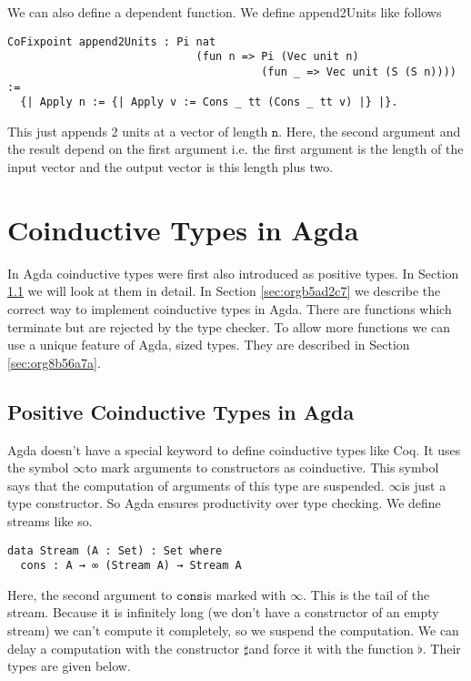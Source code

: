 \documentclass[a4paper,cleardoubleempty,BCOR1cm]{scrbook}
\begin{document}
We can also define a dependent function.  We define append2Units like
follows
\begin{verbatim}
CoFixpoint append2Units : Pi nat
                             (fun n => Pi (Vec unit n)
                                       (fun _ => Vec unit (S (S n)))) :=
  {| Apply n := {| Apply v := Cons _ tt (Cons _ tt v) |} |}.
\end{verbatim}
This just appends 2 units at a vector of length $\mathtt{n}$.  Here, the second
argument and the result depend on the first argument i.e. the first argument
is the length of the input vector and the output vector is this length plus
two.

\section{Coinductive Types in Agda}
\label{sec:org2269e7d}
In Agda coinductive types were first also introduced as positive types. In
Section \ref{sec:org9e2cfbd} we will look at them in
detail. In Section \ref{sec:orgb5ad2c7} we describe the correct
way to implement coinductive types in Agda. There are functions which
terminate but are rejected by the type checker.   To allow more functions we can use a unique feature of Agda, sized
types. They are described in Section \ref{sec:org8b56a7a}.

\subsection{Positive Coinductive Types in Agda}
\label{sec:org9e2cfbd}
Agda doesn't have a special keyword to define coinductive types like Coq.  It
uses the symbol $\mathtt{\infty}$\;to mark arguments to constructors as coinductive.
This symbol says that the computation of arguments of this type are suspended.
$\mathtt{\infty}$\;is just a type constructor.  So Agda ensures productivity over type
checking. We define streams like so.

\begin{verbatim}
data Stream (A : Set) : Set where
  cons : A → ∞ (Stream A) → Stream A
\end{verbatim}

Here, the second argument to $\mathtt{cons}$\;is marked with $\mathtt{\infty}$. This is the tail of
the stream. Because it is infinitely long (we don't have a constructor of an
empty stream) we can't compute it completely, so we suspend the computation.
We can delay a computation with the constructor $\mathtt{\sharp}$\;and force it with
the function $\mathtt{\flat}$. Their types are given below.
\end{document}
